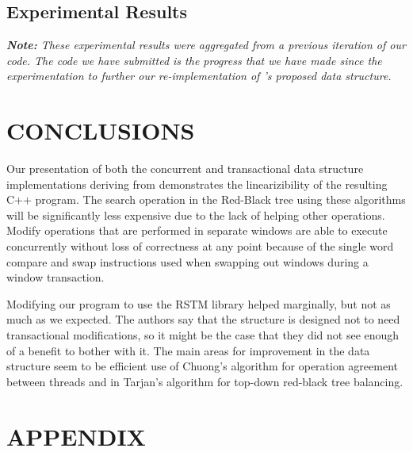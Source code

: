 \documentclass[letterpaper, 10 pt, conference]{ieeeconf}
\begin{document}
\subsection{Experimental Results}
\textit{\textbf{Note:} These experimental results were aggregated from a previous iteration of our code. The code we have submitted is the progress that we have made since the experimentation to further our re-implementation of \cite{c1}'s proposed data structure.}

	\section{CONCLUSIONS}
	
	Our presentation of both the concurrent and transactional data structure implementations deriving from \cite{c1} demonstrates the linearizibility of the resulting C++ program. The search operation in the Red-Black tree using these algorithms will be significantly less expensive due to the lack of helping other operations. Modify operations that are performed in separate windows are able to execute concurrently without loss of correctness at any point because of the single word compare and swap instructions used when swapping out windows during a window transaction.

	Modifying our program to use the RSTM library helped marginally, but not as much as we expected. The authors say that the structure is designed not to need transactional modifications, so it might be the case that they did not see enough of a benefit to bother with it. The main areas for improvement in the data structure seem to be efficient use of Chuong's algorithm for operation agreement between threads and in Tarjan's algorithm for top-down red-black tree balancing.

	\section*{APPENDIX}
	
\end{document}
